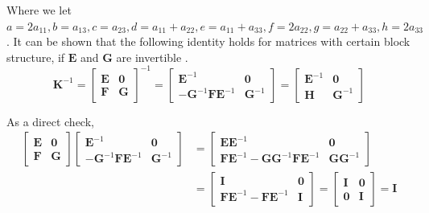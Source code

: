 \documentclass{article}
\begin{document}
Where we let $a=2a_{11}, b=a_{13}, c=a_{23}, d=a_{11}+a_{22}, e=a_{11}+a_{33}, f=2a_{22},g=a_{22}+a_{33}, h=2a_{33}$.
It can be shown that the following identity holds for matrices with certain block structure, if $\mathbf{E}$ and $\mathbf{G}$ are invertible \citep{MagnusNeudecker1999}.
\begin{equation}
\mathbf{K}^{-1}=
    \begin{bmatrix}
        \mathbf{E} & \mathbf{0} \\
        \mathbf{F} & \mathbf{G}
    \end{bmatrix}^{-1}
    =
    \begin{bmatrix}
        \mathbf{E}^{-1} & \mathbf{0} \\
        -\mathbf{G}^{-1} \mathbf{F} \mathbf{E}^{-1}  & \mathbf{G}^{-1}
    \end{bmatrix}
    =
    \begin{bmatrix}
        \mathbf{E}^{-1} & \mathbf{0} \\
        \mathbf{H}  & \mathbf{G}^{-1}
    \end{bmatrix}
    \label{eq:block_matrix_inverse2}
\end{equation}

As a direct check,
\begin{equation}
\begin{aligned}
\begin{bmatrix}
\mathbf{E} & \mathbf{0} \\
\mathbf{F} & \mathbf{G}
\end{bmatrix}
\begin{bmatrix}
\mathbf{E}^{-1} & \mathbf{0} \\
-\mathbf{G}^{-1}\mathbf{F}\mathbf{E}^{-1} & \mathbf{G}^{-1}
\end{bmatrix}
&=
\begin{bmatrix}
\mathbf{E}\mathbf{E}^{-1} & \mathbf{0} \\
\mathbf{F}\mathbf{E}^{-1}-\mathbf{G}\mathbf{G}^{-1}\mathbf{F}\mathbf{E}^{-1} & \mathbf{G}\mathbf{G}^{-1}
\end{bmatrix} \\
&=
\begin{bmatrix}
\mathbf{I} & \mathbf{0} \\
\mathbf{F}\mathbf{E}^{-1}-\mathbf{F}\mathbf{E}^{-1} & \mathbf{I}
\end{bmatrix}
=
\begin{bmatrix}
\mathbf{I} & \mathbf{0} \\
\mathbf{0} & \mathbf{I}
\end{bmatrix}
=\mathbf{I}
\end{aligned}
\label{eq:block_matrix_inverse_check}
\end{equation}
\end{document}
